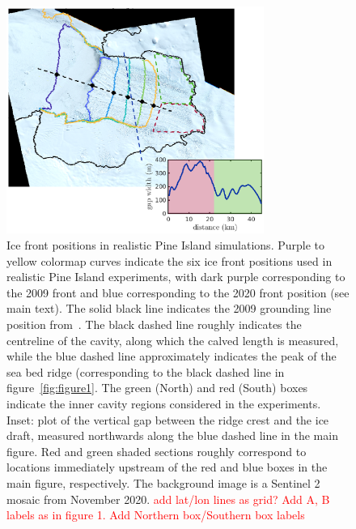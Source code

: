 \documentclass[draft]{agujournal2019}
\newcommand{\red}[1]{\textcolor{red}{#1}}
\begin{document}
\begin{figure}
    \centering
    \includegraphics[width = 0.75\textwidth]{../make_figures/plots/figure10.eps}
    \caption{Ice front positions in realistic Pine Island simulations. Purple to yellow colormap curves indicate the six ice front positions used in realistic Pine Island experiments, with dark purple corresponding to the 2009 front and blue corresponding to the 2020 front position (see main text). The solid black line indicates the 2009 grounding line position from~\cite{Joughin2010GRL}. The black dashed line roughly indicates the centreline of the cavity, along which the calved length is measured, while the blue dashed line approximately indicates  the peak of the sea bed ridge (corresponding to the black dashed line in figure~\ref{fig:figure1}. The green (North) and red (South) boxes indicate the inner cavity regions considered in the experiments. Inset: plot of the vertical gap between the ridge crest and the ice draft, measured northwards along the blue dashed line in the main figure. Red and green shaded sections roughly correspond to locations immediately upstream of the red and blue boxes in the main figure, respectively. The background image is a Sentinel 2 mosaic from November 2020. \red{add lat/lon lines as grid? Add A, B labels as in figure 1. Add Northern box/Southern box labels}}
    \label{fig:figure10}
\end{figure}

\end{document}
